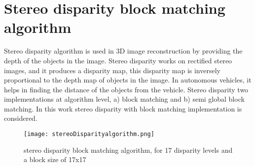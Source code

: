 \section{ Stereo disparity block matching algorithm}
Stereo disparity algorithm is used in 3D image reconstruction by providing the depth of the objects in the image. Stereo disparity works on rectified stereo images, and it produces a disparity map, this disparity map is inversely proportional to the depth map of objects in the image. In autonomous vehicles, it helps in finding the distance of the objects from the vehicle. Stereo disparity two implementations at algorithm level, a) block matching and b) semi global block matching. In this work stereo disparity with block matching implementation is considered.
\begin{figure}[htb]
	\centering
	\texttt{[image: stereoDisparityalgorithm.png]}
	\caption{stereo disparity block matching algorithm, for 17 disparity levels and a block size of 17x17}
	\label{stereoDisparityalgorithm}
\end{figure}

